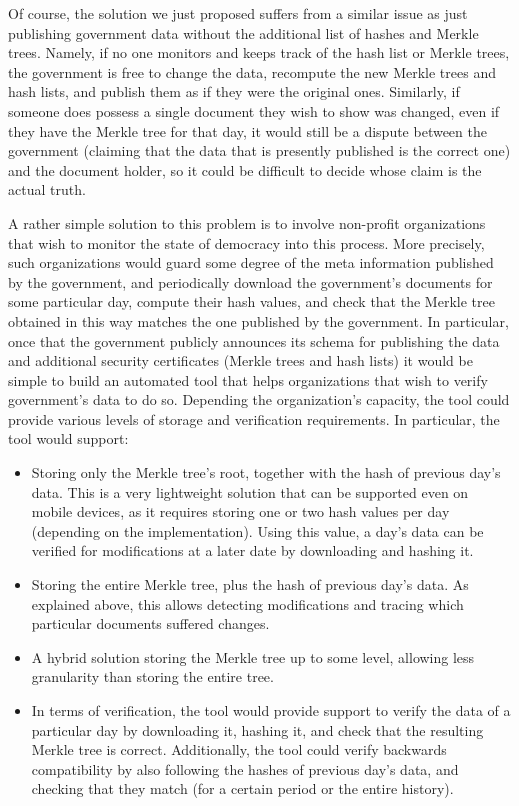 \medskip
{} Of course, the solution we just proposed suffers from a similar issue as just publishing government data without the additional list of hashes and Merkle trees. Namely, if no one monitors and keeps track of the hash list or Merkle trees, the government is free to change the data, recompute the new Merkle trees and hash lists, and publish them as if they were the original ones. Similarly, if someone does possess a single document they wish to show was changed, even if they have the Merkle tree for that day, it would still be a dispute between the government (claiming that the data that is presently published is the correct one) and the document holder, so it could be difficult to decide whose claim is the actual truth.

A rather simple solution to this problem is to involve non-profit organizations that wish to monitor the state of democracy  into this process. More precisely, such organizations would guard some degree of the meta information published by the government, and periodically download the government's documents for some particular day, compute their hash values, and check that the Merkle tree obtained in this way matches the one published by the government. In particular, once that the government publicly announces its schema for publishing the data and additional security certificates (Merkle trees and hash lists) it would be simple to build an automated tool that helps organizations that wish to verify government's data to do so. Depending the organization's capacity, the tool could provide various levels of storage and verification requirements. In particular, the tool would support:
\begin{itemize}
\item Storing only the Merkle tree's root, together with the hash of previous day's data. This is a very lightweight solution that can be supported even on mobile devices, as it requires storing one or two hash values per day (depending on the implementation). Using this value, a day's data can be verified for modifications at a later date by downloading and hashing it.
\item Storing the entire Merkle tree, plus the hash of previous day's data. As explained above, this allows detecting modifications and tracing which particular documents suffered changes.
\item A hybrid solution storing the Merkle tree up to some level, allowing less granularity than storing the entire tree.
\item In terms of verification, the tool would provide support to verify the data of a particular day by downloading it, hashing it, and check that the resulting Merkle tree is correct. Additionally, the tool could verify backwards compatibility by also following the hashes of previous day's data, and checking that they match (for a certain period or the entire history).
\end{itemize}

